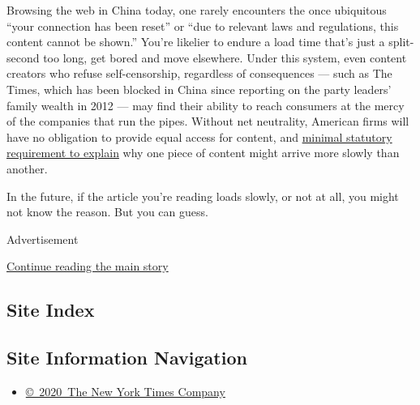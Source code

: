 Browsing the web in China today, one rarely encounters the once
ubiquitous ``your connection has been reset'' or ``due to relevant laws
and regulations, this content cannot be shown.'' You're likelier to
endure a load time that's just a split-second too long, get bored and
move elsewhere. Under this system, even content creators who refuse
self-censorship, regardless of consequences --- such as The Times, which
has been blocked in China since reporting on the party leaders' family
wealth in 2012 --- may find their ability to reach consumers at the
mercy of the companies that run the pipes. Without net neutrality,
American firms will have no obligation to provide equal access for
content, and
\href{https://www.theverge.com/2017/2/23/14714142/fcc-lifts-net-neutrality-transparency-rules-smaller-isps}{minimal
statutory requirement to explain} why one piece of content might arrive
more slowly than another.

In the future, if the article you're reading loads slowly, or not at
all, you might not know the reason. But you can guess.

Advertisement

\protect\hyperlink{after-bottom}{Continue reading the main story}

\hypertarget{site-index}{%
\subsection{Site Index}\label{site-index}}

\hypertarget{site-information-navigation}{%
\subsection{Site Information
Navigation}\label{site-information-navigation}}

\begin{itemize}
\tightlist
\item
  \href{https://help.nytimes3xbfgragh.onion/hc/en-us/articles/115014792127-Copyright-notice}{©~2020~The
  New York Times Company}
\end{itemize}

